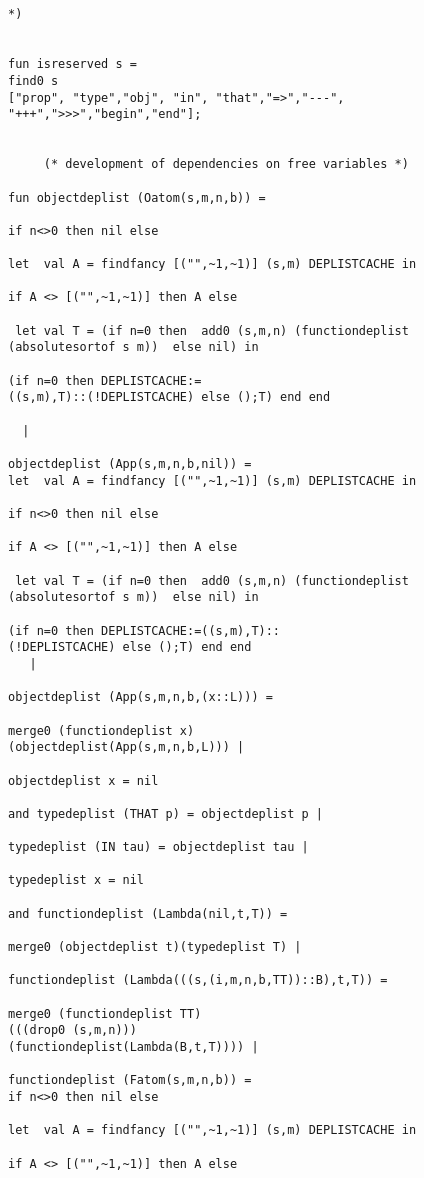 \documentclass[12pt]{article}
\begin{document}
\begin{verbatim}


*)


fun isreserved s = 
find0 s 
["prop", "type","obj", "in", "that","=>","---", "+++",">>>","begin","end"];		


     (* development of dependencies on free variables *)

fun objectdeplist (Oatom(s,m,n,b)) =

if n<>0 then nil else 

let  val A = findfancy [("",~1,~1)] (s,m) DEPLISTCACHE in

if A <> [("",~1,~1)] then A else

 let val T = (if n=0 then  add0 (s,m,n) (functiondeplist 
(absolutesortof s m))  else nil) in

(if n=0 then DEPLISTCACHE:=
((s,m),T)::(!DEPLISTCACHE) else ();T) end end

  |

objectdeplist (App(s,m,n,b,nil)) =
let  val A = findfancy [("",~1,~1)] (s,m) DEPLISTCACHE in

if n<>0 then nil else

if A <> [("",~1,~1)] then A else

 let val T = (if n=0 then  add0 (s,m,n) (functiondeplist 
(absolutesortof s m))  else nil) in

(if n=0 then DEPLISTCACHE:=((s,m),T)::
(!DEPLISTCACHE) else ();T) end end
   |

objectdeplist (App(s,m,n,b,(x::L))) =

merge0 (functiondeplist x)
(objectdeplist(App(s,m,n,b,L))) |

objectdeplist x = nil 

and typedeplist (THAT p) = objectdeplist p |

typedeplist (IN tau) = objectdeplist tau |

typedeplist x = nil

and functiondeplist (Lambda(nil,t,T)) =

merge0 (objectdeplist t)(typedeplist T) |

functiondeplist (Lambda(((s,(i,m,n,b,TT))::B),t,T)) =

merge0 (functiondeplist TT)
(((drop0 (s,m,n)))
(functiondeplist(Lambda(B,t,T)))) |

functiondeplist (Fatom(s,m,n,b)) = 
if n<>0 then nil else

let  val A = findfancy [("",~1,~1)] (s,m) DEPLISTCACHE in

if A <> [("",~1,~1)] then A else


\end{verbatim}
\end{document}
